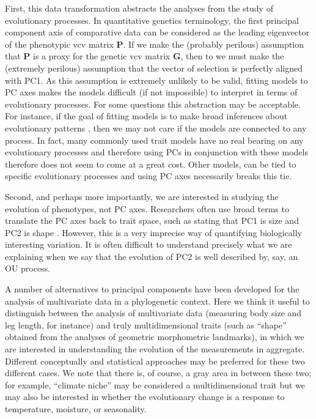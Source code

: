 \documentclass[a4paper,12pt]{article}
\begin{document}
First, this data transformation abstracts the analyses from the study of evolutionary processes. In quantitative genetics terminology, the first principal component axis of comparative data can be considered as the leading eigenvector of the phenotypic vcv matrix $\mathbf{P}$. If we make the (probably perilous) assumption that $\mathbf{P}$ is a proxy for the genetic vcv matrix $\mathbf{G}$, then to we must make the (extremely perilous) assumption that the vector of selection is perfectly aligned with PC1. As this assumption is extremely unlikely to be valid, fitting models to PC axes makes the models difficult (if not impossible) to interpret in terms of evolutionary processes. For some questions this abstraction may be acceptable. For instance, if the goal of fitting models is to make broad inferences about evolutionary patterns \citep{Freckleton2011, Hunt2012}, then we may not care if the models are connected to any process. In fact, many commonly used trait models \citep[notably, the ``Pagel'' tree transformations $\lambda, \delta, \kappa$][]{Pagel1997, Pagel1999} have no real bearing on any evolutionary processes \citep{HansenOrzack2005} and therefore using PCs in conjunction with these models therefore does not seem to come at a great cost. Other models, can be tied to specific evolutionary processes \citep{HansenMartins1996, EstesArnold2007, Hansen2008, Hansen2012SysBio, PennellHarmon, PennellPE} and using PC axes necessarily breaks this tie.

Second, and perhaps more importantly, we are interested in studying the evolution of phenotypes, not PC axes. Researchers often use broad terms to translate the PC axes back to trait space, such as stating that PC1 is size and PC2 is shape \citep[e.g.,][]{Harmon2010, Price2014}. However, this is a very imprecise way of quantifying biologically interesting variation. It is often difficult to understand precisely what we are explaining when we say that the evolution of PC2 is well described by, say, an OU process.

A number of alternatives to principal components have been developed for the analysis of multivariate data in a phylogenetic context. Here we think it useful to distinguish between the analysis of multivariate data (measuring body size and leg length, for instance) and truly multidimensional traits (such as ``shape'' obtained from the analyses of geometric morphometric landmarks), in which we are interested in understanding the evolution of the measurements in aggregate. Different conceptually and statistical approaches may be preferred for these two different cases. We note that there is, of course, a gray area in between these two; for example, ``climate niche'' may be considered a multidimensional trait but we may also be interested in whether the evolutionary change is a response to temperature, moisture, or seasonality.
\end{document}
